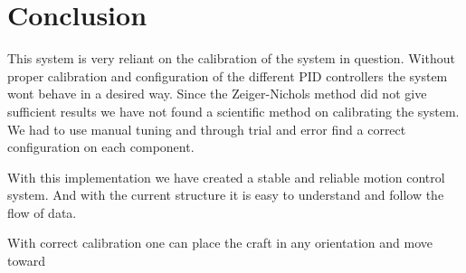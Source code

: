 \section{Conclusion}\label{sec:conclusion}

This system is very reliant on the calibration of the system in question. Without proper calibration and configuration of the different PID controllers the system wont behave in a desired way. Since the Zeiger-Nichols method did not give sufficient results we have not found a scientific method on calibrating the system. We had to use manual tuning and through trial and error find a correct configuration on each component.


With this implementation we have created a stable and reliable motion control system. And with the current structure it is easy to understand and follow the flow of data. 

With correct calibration one can place the craft in any orientation and move toward
